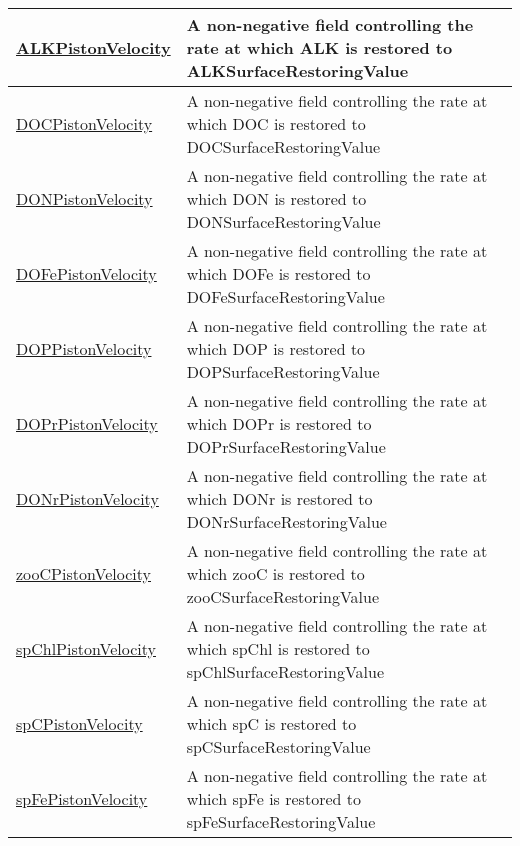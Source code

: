 {\begin{center}
\begin{longtable}{| p{2.0in} | p{4.0in} |}
    \hline
    \hyperref[subsec:var_sec_tracersSurfaceRestoringFields_ALKPistonVelocity]{ALKPistonVelocity} & A non-negative field controlling the rate at which ALK is restored to ALKSurfaceRestoringValue \\
    \hline
    \hyperref[subsec:var_sec_tracersSurfaceRestoringFields_DOCPistonVelocity]{DOCPistonVelocity} & A non-negative field controlling the rate at which DOC is restored to DOCSurfaceRestoringValue \\
    \hline
    \hyperref[subsec:var_sec_tracersSurfaceRestoringFields_DONPistonVelocity]{DONPistonVelocity} & A non-negative field controlling the rate at which DON is restored to DONSurfaceRestoringValue \\
    \hline
    \hyperref[subsec:var_sec_tracersSurfaceRestoringFields_DOFePistonVelocity]{DOFePistonVelocity} & A non-negative field controlling the rate at which DOFe is restored to DOFeSurfaceRestoringValue \\
    \hline
    \hyperref[subsec:var_sec_tracersSurfaceRestoringFields_DOPPistonVelocity]{DOPPistonVelocity} & A non-negative field controlling the rate at which DOP is restored to DOPSurfaceRestoringValue \\
    \hline
    \hyperref[subsec:var_sec_tracersSurfaceRestoringFields_DOPrPistonVelocity]{DOPrPistonVelocity} & A non-negative field controlling the rate at which DOPr is restored to DOPrSurfaceRestoringValue \\
    \hline
    \hyperref[subsec:var_sec_tracersSurfaceRestoringFields_DONrPistonVelocity]{DONrPistonVelocity} & A non-negative field controlling the rate at which DONr is restored to DONrSurfaceRestoringValue \\
    \hline
    \hyperref[subsec:var_sec_tracersSurfaceRestoringFields_zooCPistonVelocity]{zooCPistonVelocity} & A non-negative field controlling the rate at which zooC is restored to zooCSurfaceRestoringValue \\
    \hline
    \hyperref[subsec:var_sec_tracersSurfaceRestoringFields_spChlPistonVelocity]{spChlPistonVelocity} & A non-negative field controlling the rate at which spChl is restored to spChlSurfaceRestoringValue \\
    \hline
    \hyperref[subsec:var_sec_tracersSurfaceRestoringFields_spCPistonVelocity]{spCPistonVelocity} & A non-negative field controlling the rate at which spC is restored to spCSurfaceRestoringValue \\
    \hline
    \hyperref[subsec:var_sec_tracersSurfaceRestoringFields_spFePistonVelocity]{spFePistonVelocity} & A non-negative field controlling the rate at which spFe is restored to spFeSurfaceRestoringValue \\

\end{longtable}
\end{center}}
